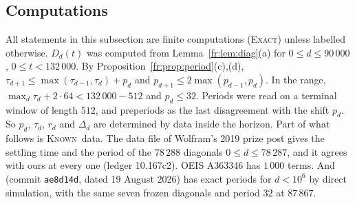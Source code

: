\documentclass[11pt]{article}
\theoremstyle{definition}
\theoremstyle{remark}
\newcommand{\EXACT}{\textsc{Exact}}
\newcommand{\KNOWN}{\textsc{Known}}
\begin{document}
\subsection{Computations}

All statements in this subsection are finite computations (\EXACT) unless labelled otherwise. $D_d(t)$ was computed from
Lemma~\ref{fr:lem:diag}(a) for $0\le d\le90\,000$, $0\le t<132\,000$. By
Proposition~\ref{fr:prop:period}(c),(d), $\tau_{d+1}\le\max(\tau_{d-1},\tau_d)+p_d$ and $p_{d+1}\le2\max(p_{d-1},p_d)$.
In the range, $\max_d\tau_d+2\cdot64<132\,000-512$ and $p_d\le32$. Periods were read on a terminal window
of length $512$, and preperiods as the last disagreement with the shift $p_d$. So $p_d$, $\tau_d$, $r_d$ and $\Delta_d$
are determined by data inside the horizon. Part of what follows is \KNOWN\ data. The data file of Wolfram's 2019 prize post \cite{Wolfram19} gives the settling time and the period of the $78\,288$ diagonals $0\le d\le78\,287$, and it agrees with ours at every one (ledger 10.167c2). OEIS A363346 \cite{A363346} has $1\,000$ terms. And \cite{Pat} (commit \texttt{ae8d14d}, dated 19 August 2026) has exact periods for $d<10^{6}$ by direct simulation, with the same seven frozen diagonals and period $32$ at $87\,867$.
\end{document}
